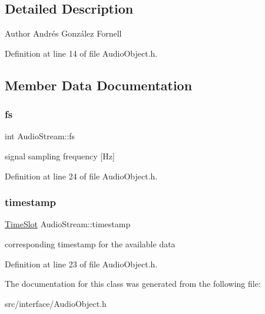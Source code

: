 \subsection{Detailed Description}
\begin{DoxyAuthor}{Author}
Andrés González Fornell 
\end{DoxyAuthor}


Definition at line 14 of file Audio\+Object.\+h.



\subsection{Member Data Documentation}
\mbox{\label{class_audio_stream_ace8ac0e7fbaa176c74804b7133c03f45}} 
\subsubsection{\texorpdfstring{fs}{fs}}
{\footnotesize\ttfamily int Audio\+Stream\+::fs}

signal sampling frequency \mbox{[}Hz\mbox{]} 

Definition at line 24 of file Audio\+Object.\+h.

\mbox{\label{class_audio_stream_aeee7107c25a1ab45b8076e422864a518}} 
\subsubsection{\texorpdfstring{timestamp}{timestamp}}
{\footnotesize\ttfamily \hyperlink{struct_audio_stream_1_1_time_slot}{Time\+Slot} Audio\+Stream\+::timestamp}

corresponding timestamp for the available data 

Definition at line 23 of file Audio\+Object.\+h.



The documentation for this class was generated from the following file\+:\begin{DoxyCompactItemize}
\item 
src/interface/Audio\+Object.\+h\end{DoxyCompactItemize}
